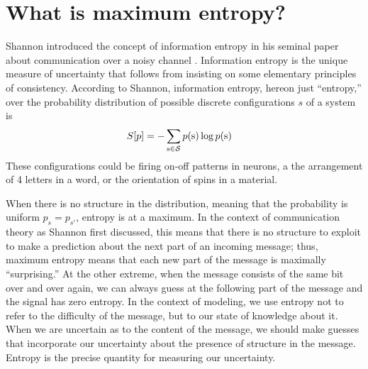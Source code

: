 \documentclass[aps,prl,twocolumn,nofootinbib]{revtex4-1}
\begin{document}

\section{What is maximum entropy?}
Shannon introduced the concept of information entropy in his seminal paper about communication over a noisy channel \cite{Shannon:1948wk}. Information entropy is the unique measure of uncertainty that follows from insisting on some elementary principles of consistency. According to Shannon, information entropy, hereon just ``entropy,'' over the probability distribution of possible discrete configurations $s$ of a system is
\begin{align}
	S[p] &= -\sum_{{\rm s}\in \mathcal{S}} p({\rm s}) \log p({\rm s})
\end{align}
These configurations could be firing on-off patterns in neurons, a the arrangement of 4 letters in a word, or the orientation of spins in a material.

When there is no structure in the distribution, meaning that the probability is uniform $p_s = p_{s'}$, entropy is at a maximum. In the context of communication theory as Shannon first discussed, this means that there is no structure to exploit to make a prediction about the next part of an incoming message; thus, maximum entropy means that each new part of the message is maximally ``surprising.'' At the other extreme, when the message consists of the same bit over and over again, we can always guess at the following part of the message and the signal has zero entropy. In the context of modeling, we use entropy not to refer to the difficulty of the message, but to our state of knowledge about it. When we are uncertain as to the content of the message, we should make guesses that incorporate our uncertainty about the presence of structure in the message. Entropy is the precise quantity for measuring our uncertainty.
\end{document}
